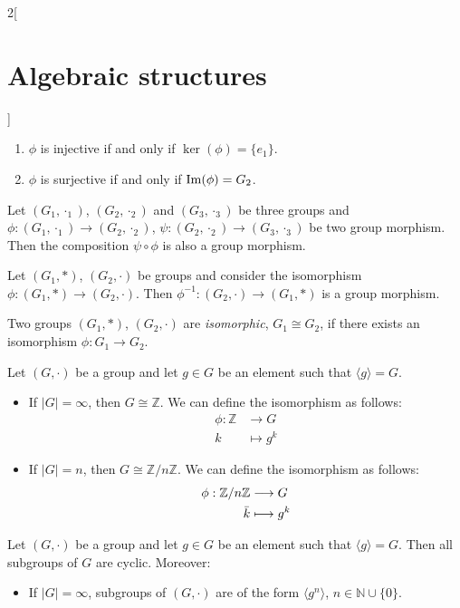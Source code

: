 \documentclass[class=article,10pt,crop=false]{standalone}
\begin{document}
\begin{multicols}{2}[\section{Algebraic structures}]
\begin{prop}
\begin{enumerate}
    \item $\phi$ is injective if and only if $\ker(\phi)=\{e_1\}$.
    \item $\phi$ is surjective if and only if $\operatorname{Im}(\phi)=G_2$.
\end{enumerate}
\end{prop}
\begin{prop}
Let $(G_1,\cdot_1)$, $(G_2,\cdot_2)$ and $(G_3,\cdot_3)$ be three groups and $\phi:(G_1,\cdot_1)\rightarrow(G_2,\cdot_2)$, $\psi:(G_2,\cdot_2)\rightarrow(G_3,\cdot_3)$ be two group morphism. Then the composition $\psi\circ\phi$ is also a group morphism.
\end{prop}
\begin{prop}
Let $(G_1,*)$, $(G_2,\cdot)$ be groups and consider the isomorphism $\phi:(G_1,*)\rightarrow(G_2,\cdot)$. Then $\phi^{-1}:(G_2,\cdot)\rightarrow(G_1,*)$ is a group morphism.
\end{prop}
\begin{definition}
Two groups $(G_1,*)$, $(G_2,\cdot)$ are \textit{isomorphic}, $G_1\cong G_2$, if there exists an isomorphism $\phi:G_1\rightarrow G_2$.
\end{definition}
\begin{theorem}
Let $(G,\cdot)$ be a group and let $g\in G$ be an element such that $\langle g\rangle=G$.
\begin{itemize}
    \item If $|G|=\infty$, then $G\cong\mathbb{Z}$. We can define the isomorphism as follows: 
    \begin{align*}
        \phi:\mathbb{Z}&\longrightarrow G\\
        k&\longmapsto g^k
    \end{align*}
    \item If $|G|=n$, then $G\cong\mathbb{Z}/n\mathbb{Z}$. We can define the isomorphism as follows: 
    \begin{align*}
        \phi:\mathbb{Z}/n\mathbb{Z}&\longrightarrow G\\
        \Bar{k}&\longmapsto g^k
    \end{align*}
\end{itemize}
\end{theorem}
\begin{corollary}
Let $(G,\cdot)$ be a group and let $g\in G$ be an element such that $\langle g\rangle=G$. Then all subgroups of $G$ are cyclic. Moreover:
\begin{itemize}
    \item If $|G|=\infty$, subgroups of $(G,\cdot)$ are of the form $\langle g^n\rangle$, $n\in\mathbb{N}\cup\{0\}$. 

\end{itemize}
\end{corollary}
\end{multicols}
\end{document}
